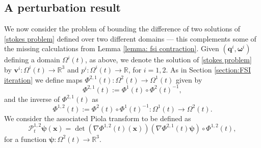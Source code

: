 \documentclass[a4paper]{amsart}
\numberwithin{equation}{section}
\newcommand{\grad}{\nabla}
\theoremstyle{plain}
\newcommand{\mbf}[1]{\mathbf{#1}}
\newcommand{\mbb}[1]{\mathbb{#1}}
\begin{document}
\subsection{A perturbation result}
\label{subsection: stokes perturbation}
We now consider the problem of bounding the difference of two solutions of \eqref{stokes problem} defined over two different domains --- this complements some of the missing calculations from Lemma \ref{lemma: fsi contraction}.
Given $(\mbf{q}^i, \boldsymbol{\omega}^i)$ defining a domain $\Omega^i(t)$, as above, we denote the solution of \eqref{stokes problem} by $\mbf{v}^i : \Omega^i(t) \rightarrow \mbb{R}^3$ and $p^i: \Omega^i(t) \rightarrow \mbb{R}$, for $i = 1,2$.
As in Section \ref{section:FSI iteration} we define maps $\Phi^{2,1}(t) : \Omega^2(t) \rightarrow \Omega^1(t)$ given by
\[ \Phi^{2,1}(t) := \Phi^1(t) \circ \Phi^2(t)^{-1},\]
and the inverse of $\Phi^{2,1}(t)$ as
\[ \Phi^{1,2}(t) := \Phi^2(t) \circ \Phi^1(t)^{-1} : \Omega^1(t) \rightarrow \Omega^2(t). \]
We consider the associated Piola transform to be defined as
\[\mathcal{P}_t^{1,2} \boldsymbol{\psi}(\mbf{x}) = {\det(\grad\Phi^{1,2}(t)(\mbf{x}))} (\grad\Phi^{2,1}(t) \boldsymbol{\psi} )\circ \Phi^{1,2}(t), \]
for a function $\boldsymbol{\psi}: \Omega^2(t) \rightarrow \mbb{R}^3$.
\end{document}

